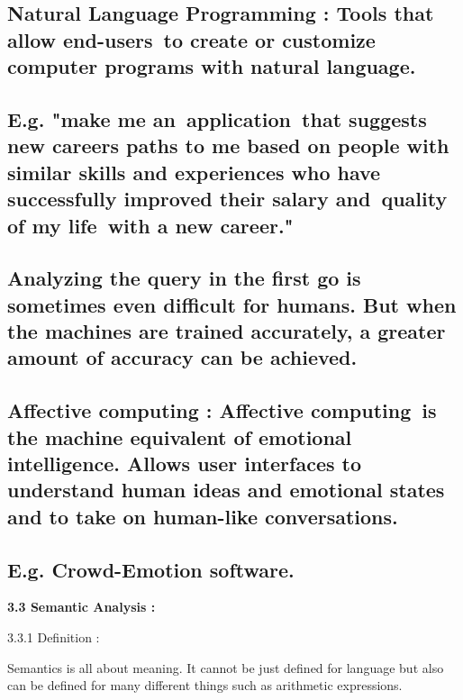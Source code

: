 \documentclass{article} %
\begin{document}
\noindent 
\subsection{}


\subsection{ Natural Language Programming : Tools that allow end-users~to create or customize computer programs with natural language. }

\noindent 
\subsection{E.g. "make me an~application~that suggests new careers paths to me based on people with similar skills and experiences who have successfully improved their salary and~quality of my life~with a new career."}

\noindent 
\subsection{Analyzing the query in the first go is sometimes even difficult for humans. But when the machines are trained accurately, a greater amount of accuracy can be achieved.}

\noindent 
\subsection{}


\subsection{ Affective computing :   Affective computing~is the machine equivalent of emotional intelligence. Allows user interfaces to understand human ideas and emotional states and to take on human-like conversations.}

\noindent 
\subsection{E.g. Crowd-Emotion software.}

\noindent 

\noindent 

\noindent 

\textbf{3.3 Semantic Analysis :}

\textbf{ }3.3.1 Definition : 

Semantics is all about meaning. It cannot be just defined for language but also can be defined for many different things such as arithmetic expressions. 
\end{document}
